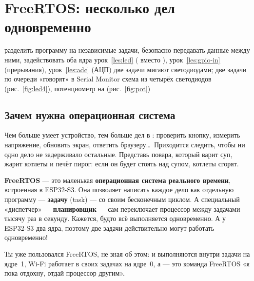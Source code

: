 \section{FreeRTOS: несколько дел одновременно}
\label{les:rtos}
\lessonintro
  {разделить программу на независимые задачи, безопасно передавать данные между ними, задействовать оба ядра}
  {урок~\ref{les:led} ( вместо ), урок~\ref{les:gpio-in} (прерывания), урок~\ref{les:adc} (АЦП)}
  {две задачи мигают светодиодами; две задачи по очереди «говорят» в Serial Monitor}
  {схема из четырёх светодиодов (рис.~\ref{fig:led4}), потенциометр на  (рис.~\ref{fig:pot})}

\subsection{Зачем нужна операционная система}

Чем больше умеет устройство, тем больше дел в : проверить кнопку, измерить напряжение,
обновить экран, ответить браузеру\ldots\ Приходится следить, чтобы ни одно дело не задерживало
остальные. Представь повара, который варит суп, жарит котлеты и печёт пирог: если он будет стоять
над супом, котлеты сгорят.

\textbf{FreeRTOS} --- это маленькая \textbf{операционная система реального времени}, встроенная в ESP32-S3.
Она позволяет написать каждое дело как отдельную программу --- \textbf{задачу} (task) --- со своим бесконечным
циклом. А специальный «диспетчер» --- \textbf{планировщик} --- сам переключает процессор между задачами
тысячу раз в секунду. Кажется, будто всё выполняется одновременно. А у ESP32-S3 два ядра, поэтому
две задачи действительно могут работать одновременно!

\begin{fact}
Ты уже пользовался FreeRTOS, не зная об этом:  и  выполняются внутри задачи
 на ядре~1, Wi-Fi работает в своих задачах на ядре~0, а  --- это
команда FreeRTOS «я пока отдохну, отдай процессор другим».
\end{fact}

